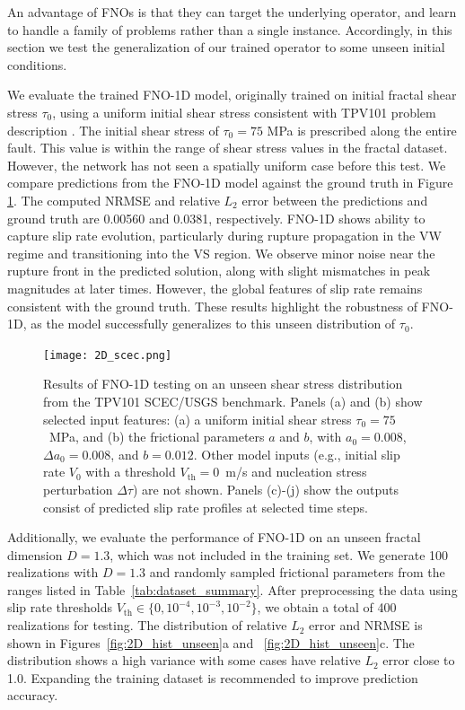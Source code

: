 \documentclass[draft]{agujournal2019}
\begin{document}
An advantage of FNOs is that they can target the underlying operator, and learn to handle a family of problems rather than a single instance. Accordingly, in this section we test the generalization of our trained operator to some unseen initial conditions.

We evaluate the trained FNO-1D model, originally trained on initial fractal shear stress \(\tau_{0}\), using a uniform initial shear stress consistent with TPV101 problem description \cite{harris2018suite, harris2009scec, kammer2021uguca}. The initial shear stress of \(\tau_{0} = 75\) MPa is prescribed along the entire fault. This value is within the range of shear stress values in the fractal dataset. However, the network has not seen a spatially uniform case before this test. We compare predictions from the FNO-1D model against the ground truth in Figure \ref{fig:2D_benchmark}. The computed NRMSE and relative \(L_2\) error between the predictions and ground truth are 0.00560 and 0.0381, respectively. FNO-1D shows ability to capture slip rate evolution, particularly during rupture propagation in the VW regime and transitioning into the VS region. We observe minor noise near the rupture front in the predicted solution, along with slight mismatches in peak magnitudes at later times. However, the global features of slip rate remains consistent with the ground truth. These results highlight the robustness of FNO-1D, as the model successfully generalizes to this unseen distribution of \(\tau_{0}\).

\begin{figure}
\centering
\texttt{[image: 2D\_scec.png]}
\caption{\label{fig:2D_benchmark}Results of FNO-1D testing on an unseen shear stress distribution from the TPV101 SCEC/USGS benchmark. Panels (a) and (b) show selected input features: (a) a uniform initial shear stress \(\tau_0 = 75\)~MPa, and (b) the frictional parameters \(a\) and \(b\), with \(a_0 = 0.008\), \(\Delta a_0 = 0.008\), and \(b=0.012\). Other model inputs (e.g., initial slip rate \(V_0\) with  a threshold \(V_\text{th} = 0\)~m/s and nucleation stress perturbation \(\Delta \tau\)) are not shown. Panels (c)-(j) show the outputs consist of predicted slip rate profiles at selected time steps.
}
\end{figure}

Additionally, we evaluate the performance of FNO-1D on an unseen fractal dimension \(D = 1.3\), which was not included in the training set. We generate 100 realizations with \(D = 1.3\) and randomly sampled frictional parameters from the ranges listed in Table~\ref{tab:dataset_summary}. After preprocessing the data using slip rate thresholds \(V_{\text{th}} \in \{0, 10^{-4}, 10^{-3}, 10^{-2}\}\), we obtain a total of 400 realizations for testing. The distribution of relative \(L_2\) error and NRMSE is shown in Figures~\ref{fig:2D_hist_unseen}a and ~\ref{fig:2D_hist_unseen}c. The distribution shows a high variance with some cases have relative \(L_2\) error close to 1.0. Expanding the training dataset is recommended to improve prediction accuracy.  
\end{document}
